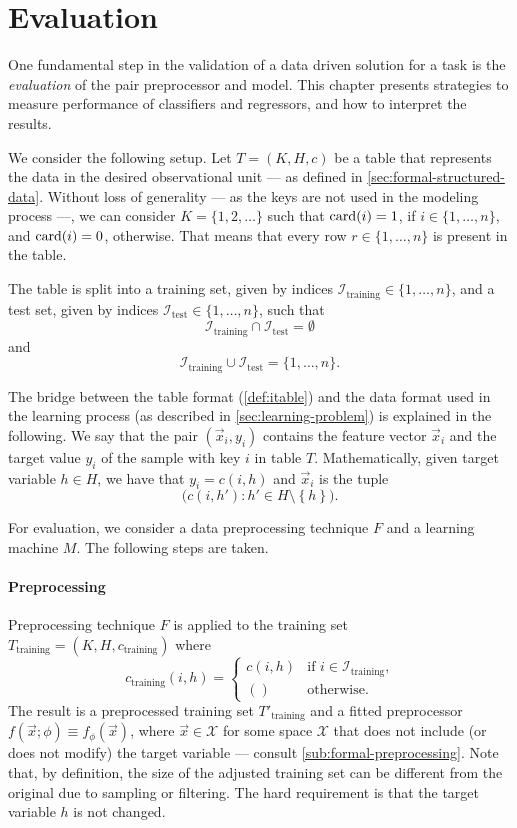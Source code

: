 \section{Evaluation}
\label{sec:evaluation}

One fundamental step in the validation of a data driven solution for a task is the
\emph{evaluation} of the pair preprocessor and model. This chapter presents strategies to
measure performance of
classifiers and regressors, and how to interpret the results.

We consider the following setup.  Let $T = (K, H, c)$ be a table that represents the data
in the desired observational unit --- as defined in \cref{sec:formal-structured-data}.
Without loss of generality --- as the keys are not used in the modeling process ---, we
can consider $K = \{1, 2, \dots\}$ such that $\rowcard[i] = 1$, if $i \in \{1, \dots,
n\}$, and $\rowcard[i] = 0$, otherwise.  That means that every row $r \in \{1, \dots, n\}$
is present in the table.

The table is split into a training set, given by indices
$\mathcal{I}_\text{training} \in \{1, \dots, n\}$, and a test set, given by indices
$\mathcal{I}_\text{test} \in \{1, \dots, n\}$, such that $$\mathcal{I}_\text{training}
\cap \mathcal{I}_\text{test} = \emptyset$$ and $$\mathcal{I}_\text{training} \cup
\mathcal{I}_\text{test} = \{1,\dots,n\}\text{.}$$

The bridge between the table format (\cref{def:itable}) and the data format used in the
learning process (as described in \cref{sec:learning-problem}) is explained in the
following.  We say that the pair $(\vec{x}_i, y_i)$ contains the feature vector $\vec{x}_i$
and the target value $y_i$ of the sample with key $i$ in table $T$.  Mathematically,
given target variable $h \in H$, we have that $y_i = c(i, h)$ and $\vec{x}_i$ is the tuple
$$\big(c(i, h') : h' \in H \setminus \left\{ h \right\}\big)\text{.}$$

For evaluation, we consider a data preprocessing technique $F$ and a learning machine
$M$.  The following steps are taken.

\paragraph{Preprocessing}

Preprocessing technique $F$ is applied to the training set $T_\text{training} = (K, H,
c_\text{training})$ where \[
  c_\text{training}(i, h) = \begin{cases}
    c(i, h) & \text{if } i \in \mathcal{I}_\text{training}\text{,} \\
    () & \text{otherwise}\text{.}
  \end{cases}
\]  The result is a preprocessed training set $T'_\text{training}$ and a fitted
preprocessor $f(\vec{x}; \phi) \equiv f_\phi(\vec{x})$, where $\vec{x} \in \mathcal{X}$
for some space $\mathcal{X}$ that does not include (or does not modify) the target
variable --- consult \cref{sub:formal-preprocessing}.  Note that, by definition, the size
of the adjusted training set can be different from the original due to sampling or
filtering.  The hard requirement is that the target variable $h$ is not changed.

